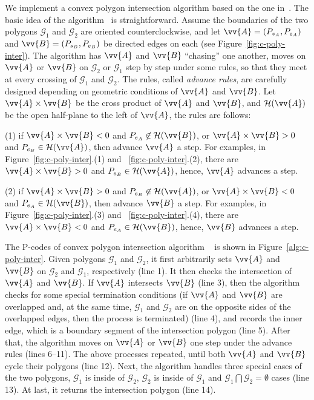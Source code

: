 We implement a convex polygon intersection algorithm based on the one in~\cite{ORourke:Intersection}.
%
The basic idea of the algorithm~\cite{ORourke:Intersection} is straightforward. Assume the boundaries of the two polygons $\mathcal{G}_1$ and $\mathcal{G}_2$ are oriented counterclockwise, and let $\vv{A} = (P_{s_A}, P_{e_A})$ and $\vv{B} = (P_{s_B}, P_{e_B})$ be directed edges on each (see Figure~\ref{fig:c-poly-inter}).
%
The algorithm has $\vv{A}$ and $\vv{B}$ ``chasing'' one another, \ie moves on $\vv{A}$ or $\vv{B}$ on $\mathcal{G}_2$ or $\mathcal{G}_1$ step by step under some rules, so that they meet at every crossing of $\mathcal{G}_1$ and $\mathcal{G}_2$.
%
The rules, called \emph{advance rules}, are carefully designed depending on geometric conditions of $\vv{A}$ and $\vv{B}$.
Let $\vv{A} \times \vv{B}$ be the cross product of $\vv{A}$ and $\vv{B}$, and $\mathcal{H}(\vv{A})$ be the open half-plane to the left of $\vv{A}$, the rules are follows:

(1) if $\vv{A} \times \vv{B} < 0$ and $P_{e_A} \not \in \mathcal{H}(\vv{B})$, or $\vv{A} \times \vv{B} > 0$ and $P_{e_B} \in \mathcal{H}(\vv{A})$, then advance $\vv{A}$ a step. For examples, in Figure~\ref{fig:c-poly-inter}.(1) and ~\ref{fig:c-poly-inter}.(2), there are $\vv{A} \times \vv{B} > 0$ and $P_{e_B} \in \mathcal{H}(\vv{A})$, hence, $\vv{A}$ advances a step.

(2) if $\vv{A} \times \vv{B} > 0$ and $P_{e_B} \not \in \mathcal{H}(\vv{A})$, or $\vv{A} \times \vv{B} < 0$ and $P_{e_A} \in \mathcal{H}(\vv{B})$, then advance $\vv{B}$ a step. For examples, in Figure~\ref{fig:c-poly-inter}.(3) and ~\ref{fig:c-poly-inter}.(4), there are $\vv{A} \times \vv{B} < 0$ and $P_{e_A} \in \mathcal{H}(\vv{B})$, hence, $\vv{B}$ advances a step.


The P-codes of convex polygon intersection algorithm ~\cite{ORourke:Intersection} is shown in Figure~\ref{alg:c-poly-inter}.
Given polygons $\mathcal{G}_1$ and $\mathcal{G}_2$, it first arbitrarily sets $\vv{A}$ and $\vv{B}$ on $\mathcal{G}_2$ and $\mathcal{G}_1$, respectively (line 1).
%
It then checks the intersection of $\vv{A}$ and $\vv{B}$. If $\vv{A}$ intersects $\vv{B}$ (line 3), then the algorithm checks for some special termination conditions (\eg if $\vv{A}$ and $\vv{B}$ are overlapped and, at the same time, $\mathcal{G}_1$ and $\mathcal{G}_2$ are on the opposite sides of the overlapped edges, then the process is terminated) (line 4), and records the inner edge, which is a boundary segment of the intersection polygon (line 5).
After that, the algorithm moves on $\vv{A}$ or $\vv{B}$ one step under the advance rules (lines 6--11).
The above processes repeated, until both $\vv{A}$ and $\vv{B}$ cycle their polygons (line 12).
%
Next, the algorithm handles three special cases of the two polygons, \ie $\mathcal{G}_1$ is inside of $\mathcal{G}_2$, $\mathcal{G}_2$ is inside of $\mathcal{G}_1$ and $\mathcal{G}_1 \bigcap \mathcal{G}_2 = \emptyset$ cases (line 13).
%
At last, it returns the intersection polygon (line 14).

